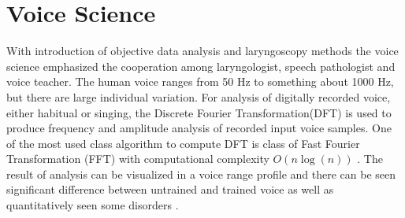 %

\section{Voice Science}
\label{sec:voice}
With introduction of objective data analysis and laryngoscopy methods the voice science emphasized the cooperation among  laryngologist, speech pathologist and voice teacher.
The human voice ranges from 50 Hz to something about 1000 Hz, but there are large  individual variation. For analysis of digitally recorded voice, either habitual or singing, the Discrete Fourier Transformation(DFT) is used to produce frequency and amplitude analysis of recorded input voice samples. One of the most used class algorithm to compute DFT is class of Fast Fourier Transformation (FFT) with computational complexity $O(n \log(n))$ \cite{Cooley1965,Frigo2005}.
The result of analysis can be visualized in a voice range profile and there can be seen significant difference between untrained and trained voice as well as quantitatively seen some disorders \cite{DeLeoLeBorgne2002,wuyts2003effects}.

